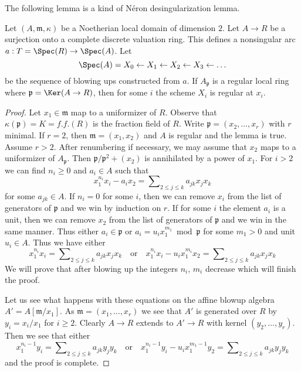 \noindent
The following lemma is a kind of N\'eron desingularization lemma.

\begin{lemma}
\label{lemma-sequence-blowups-along-arc-becomes-nonsingular}
Let $(A, \mathfrak m, \kappa)$ be a Noetherian local domain of
dimension $2$. Let $A \to R$ be a surjection onto a
complete discrete valuation ring.
This defines a nonsingular arc $a : T = \Spec(R) \to \Spec(A)$. Let
$$
\Spec(A) = X_0 \leftarrow X_1 \leftarrow X_2 \leftarrow X_3 \leftarrow \ldots
$$
be the sequence of blowing ups constructed from $a$.
If $A_\mathfrak p$ is a regular local ring where
$\mathfrak p = \Ker(A \to R)$, then
for some $i$ the scheme $X_i$ is regular at $x_i$.
\end{lemma}

\begin{proof}
Let $x_1 \in \mathfrak m$ map to a uniformizer of $R$.
Observe that $\kappa(\mathfrak p) = K = f.f.(R)$ is the
fraction field of $R$. Write $\mathfrak p = (x_2, \ldots, x_r)$
with $r$ minimal. If $r = 2$, then $\mathfrak m = (x_1, x_2)$
and $A$ is regular and the lemma is true. Assume $r > 2$.
After renumbering if necessary,
we may assume that $x_2$ maps to a uniformizer of $A_\mathfrak p$.
Then $\mathfrak p/\mathfrak p^2 + (x_2)$ is annihilated by a power
of $x_1$. For $i > 2$ we can find $n_i \geq 0$ and $a_i \in A$
such that
$$
x_1^{n_i} x_i - a_i x_2 = \sum\nolimits_{2 \leq j \leq k} a_{jk} x_jx_k
$$
for some $a_{jk} \in A$. If $n_i = 0$ for some $i$, then we can remove
$x_i$ from the list of generators of $\mathfrak p$ and we win by
induction on $r$. If for some $i$ the element $a_i$ is a unit, then
we can remove $x_2$ from the list of generators of $\mathfrak p$
and we win in the same manner. Thus either
$a_i \in \mathfrak p$ or $a_i = u_i x_1^{m_1} \bmod \mathfrak p$
for some $m_1 > 0$ and unit $u_i \in A$. Thus we have either
$$
x_1^{n_i} x_i = \sum\nolimits_{2 \leq j \leq k} a_{jk} x_jx_k
\quad\text{or}\quad
x_1^{n_i} x_i - u_i x_1^{m_i} x_2 =
\sum\nolimits_{2 \leq j \leq k} a_{jk} x_jx_k
$$
We will prove that after blowing up the integers $n_i$, $m_i$
decrease which will finish the proof.

\medskip\noindent
Let us see what happens with these equations on the affine blowup
algebra $A' = A[\mathfrak m/x_1]$. As $\mathfrak m = (x_1, \ldots, x_r)$
we see that $A'$ is generated over $R$ by $y_i = x_i/x_1$ for $i \geq 2$.
Clearly $A \to R$ extends to $A' \to R$ with kernel
$(y_2, \ldots, y_r)$. Then we see that either
$$
x_1^{n_i - 1} y_i = \sum\nolimits_{2 \leq j \leq k} a_{jk} y_jy_k
\quad\text{or}\quad
x_1^{n_i - 1} y_i - u_i x_1^{m_1 - 1} y_2 =
\sum\nolimits_{2 \leq j \leq k} a_{jk} y_jy_k
$$
and the proof is complete.
\end{proof}




